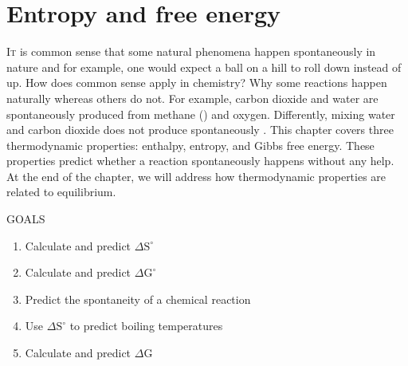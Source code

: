 \documentclass[main.tex]{subfiles}
\begin{document}
\linenumbers
  
\chapter[Entropy and free energy]{Entropy and free energy}


      \begin{marginfigure}
\end{marginfigure}


\lettrine[lines=4]{\color{black!45}I}{t} is common sense that some natural phenomena happen spontaneously in nature and for example, one would expect a ball on a hill to roll down instead of up. How does common sense apply in chemistry? Why some reactions happen naturally whereas others do not. For example, carbon dioxide and water are spontaneously produced from methane () and oxygen. Differently, mixing water and carbon dioxide does not produce spontaneously . This chapter covers three thermodynamic properties:  enthalpy, entropy, and Gibbs free energy. These properties predict whether a reaction spontaneously happens without any help. At the end of the chapter, we will address how thermodynamic properties are related to equilibrium. 
\begin{marginfigure}%
\begin{mytcbox}{GOALS}
\begin{enumerate}[label=\protect\circled{\color{white}\arabic*}]
\item Calculate and predict $\Delta \text{S}^{\circ}$
\item Calculate and predict $\Delta \text{G}^{\circ}$
\item Predict the spontaneity of a chemical reaction
\item Use $\Delta \text{S}^{\circ}$ to predict boiling temperatures
\item Calculate and predict $\Delta \text{G}$
\end{enumerate}
\end{mytcbox}
\vspace{1cm}
\begin{tcolorbox}[enhanced,colback=red!5!white,colframe=black!50!red,boxrule=1pt,
  arc=0pt,outer arc=0pt,drop heavy lifted shadow]
\faGears\ 
 \discussionTHERMODYN \end{tcolorbox}
\end{marginfigure}%
\end{document}
